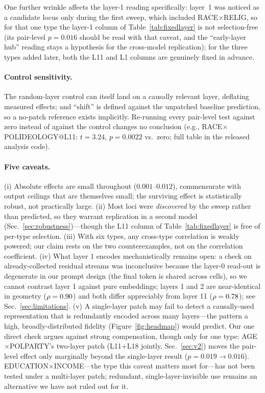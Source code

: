 One further wrinkle affects the layer-1 reading specifically: layer~1
was noticed as a candidate locus only during the first sweep, which
included RACE$\times$RELIG, so for that one type the layer-1 column of
Table~\ref{tab:fixedlayer} is not selection-free (its pair-level
$p=0.016$ should be read with that caveat, and the ``early-layer hub''
reading stays a hypothesis for the cross-model replication); for the
three types added later, both the L11 and L1 columns are genuinely
fixed in advance.

\paragraph{Control sensitivity.}
\label{app:sweep-control-sens}
The random-layer control can itself land
on a causally relevant layer, deflating measured effects; and
``shift'' is defined against the unpatched baseline prediction, so a
no-patch reference exists implicitly. Re-running every pair-level test
against zero instead of against the control changes no conclusion (e.g.,
RACE$\times$POLIDEOLOGY@L11: $t=3.24$, $p=0.0022$ vs.\ zero; full table
in the released analysis code).

\paragraph{Five caveats.}
\label{app:sweep-caveats}
(i) Absolute effects are small
throughout ($0.001$--$0.012$), commensurate with output ceilings that are
themselves small; the surviving effect is statistically robust, not
practically large. (ii) Most loci were \emph{discovered} by the sweep
rather than predicted, so they warrant replication in a second model
(Sec.~\ref{sec:robustness})---though the L11 column of
Table~\ref{tab:fixedlayer} is free of per-type selection. (iii) With six
types, any cross-type correlation is weakly powered; our claim rests on
the two counterexamples, not on the correlation coefficient. (iv) What
layer 1 encodes mechanistically remains open: a check on already-collected
residual streams was inconclusive because the layer-0 read-out is
degenerate in our prompt design (the final token is shared across cells),
so we cannot contrast layer 1 against pure embeddings; layers 1 and 2 are
near-identical in geometry ($\rho=0.90$) and both differ appreciably from
layer 11 ($\rho=0.78$); see Sec.~\ref{sec:limitations}. (v) A
single-layer patch may fail to detect a causally-used representation that
is redundantly encoded across many layers---the pattern a high,
broadly-distributed fidelity (Figure~\ref{fig:headmap}) would predict. Our one direct check argues
against strong compensation, though only for one type: AGE$\times$POLPARTY's
two-layer patch (L11+L18 jointly, Sec.~\ref{sec:v2}) moves the
pair-level effect only marginally beyond the single-layer result
($p=0.019\to0.016$). EDUCATION$\times$INCOME---the type this caveat
matters most for---has not been tested under a multi-layer patch;
redundant, single-layer-invisible use remains an alternative we have
not ruled out for it.

